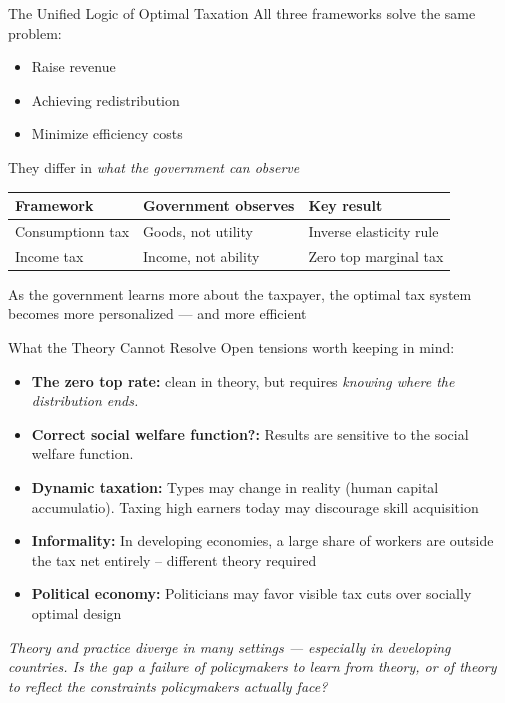 \documentclass[aspectratio=169]{beamer}
\begin{document}
\begin{frame}{The Unified Logic of Optimal Taxation}
All three frameworks solve the same problem:\\
\medskip
\begin{itemize}\setlength\itemsep{3pt}
\item Raise revenue  
\item Achieving redistribution 
\item Minimize efficiency costs
\end{itemize}\medskip
They differ in \textit{what the government can observe}
\begin{center}
\begin{tabular}{lll}
  
\hline\hline
\textbf{Framework} & \textbf{Government observes} & \textbf{Key result} \\
\hline
Consumptionn tax & Goods, not utility & Inverse elasticity rule \\
Income tax & Income, not ability & Zero top marginal tax \\

\hline\hline
\end{tabular}
\end{center}
\bigskip
 As the government learns more about the taxpayer, the optimal tax system becomes more personalized --- and more efficient
\end{frame}

\begin{frame}{What the Theory Cannot Resolve}
Open tensions worth keeping in mind:
\begin{itemize}\setlength\itemsep{6pt}
    
    \item \textbf{The zero top rate:} clean in theory, but requires \textit{knowing where the distribution ends.} 
    \item \textbf{Correct social welfare function?:} Results are sensitive to the social welfare function. 
    \item \textbf{Dynamic taxation:} Types may change in reality (human capital accumulatio). Taxing high earners today may discourage skill acquisition
    \item \textbf{Informality:} In developing economies,  a large share of workers are outside the tax net entirely -- different theory required
   \item \textbf{Political economy:} Politicians may favor visible tax cuts over socially optimal design
   

\end{itemize}

\bigskip
\small\textit{Theory and practice diverge in many settings --- especially in developing countries. Is the gap a failure of policymakers to learn from theory, or of theory to reflect the constraints policymakers actually face?}
\end{frame}
\end{document}
